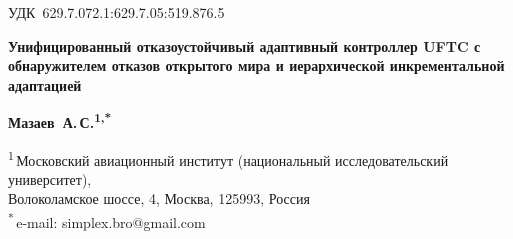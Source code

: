 \documentclass[a4paper,14pt]{extarticle}
\title{}
\date{}
\begin{document}
\thispagestyle{empty}

\begin{flushleft}
\small УДК~629.7.072.1:629.7.05:519.876.5
\end{flushleft}

\begin{center}
\large\bfseries
Унифицированный отказоустойчивый адаптивный контроллер UFTC с обнаружителем отказов открытого мира и иерархической инкрементальной адаптацией
\end{center}

\medskip

\begin{center}
\textbf{Мазаев~А.\,С.\textsuperscript{1,*}}
\end{center}

\begin{center}
\small
\textsuperscript{1}\,Московский авиационный институт (национальный исследовательский университет), \\
Волоколамское шоссе, 4, Москва, 125993, Россия \\[2pt]
\textsuperscript{*}\,e-mail: simplex.bro@gmail.com
\end{center}

\bigskip
\end{document}
